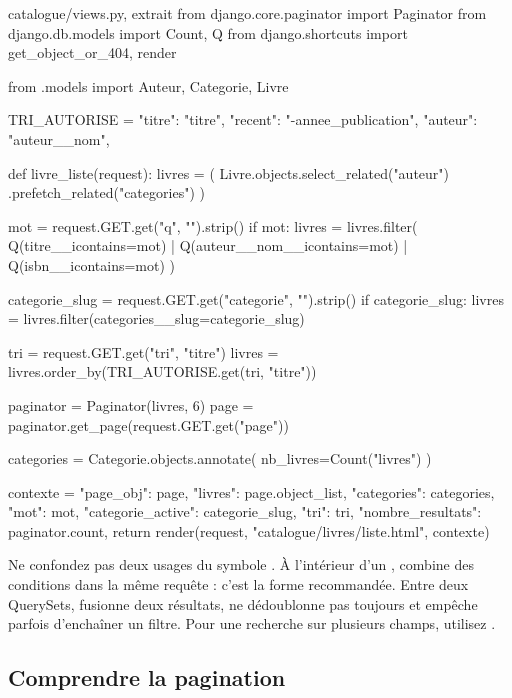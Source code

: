 \begin{codebox}[python]{catalogue/views.py, extrait}
from django.core.paginator import Paginator
from django.db.models import Count, Q
from django.shortcuts import get_object_or_404, render

from .models import Auteur, Categorie, Livre

TRI_AUTORISE = {
    "titre": "titre",
    "recent": "-annee_publication",
    "auteur": "auteur__nom",
}


def livre_liste(request):
    livres = (
        Livre.objects.select_related("auteur")
        .prefetch_related("categories")
    )

    mot = request.GET.get("q", "").strip()
    if mot:
        livres = livres.filter(
            Q(titre__icontains=mot)
            | Q(auteur__nom__icontains=mot)
            | Q(isbn__icontains=mot)
        )

    categorie_slug = request.GET.get("categorie", "").strip()
    if categorie_slug:
        livres = livres.filter(categories__slug=categorie_slug)

    tri = request.GET.get("tri", "titre")
    livres = livres.order_by(TRI_AUTORISE.get(tri, "titre"))

    paginator = Paginator(livres, 6)
    page = paginator.get_page(request.GET.get("page"))

    categories = Categorie.objects.annotate(
        nb_livres=Count("livres")
    )

    contexte = {
        "page_obj": page,
        "livres": page.object_list,
        "categories": categories,
        "mot": mot,
        "categorie_active": categorie_slug,
        "tri": tri,
        "nombre_resultats": paginator.count,
    }
    return render(request, "catalogue/livres/liste.html", contexte)
\end{codebox}

\begin{attention}
Ne confondez pas deux usages du symbole \code{|}. À l'intérieur d'un
,  combine des conditions dans la même
requête : c'est la forme recommandée. Entre deux QuerySets,
 fusionne deux résultats, ne dédoublonne pas toujours
et empêche parfois d'enchaîner un filtre. Pour une recherche sur plusieurs champs,
utilisez .
\end{attention}

\subsection{Comprendre la pagination}

